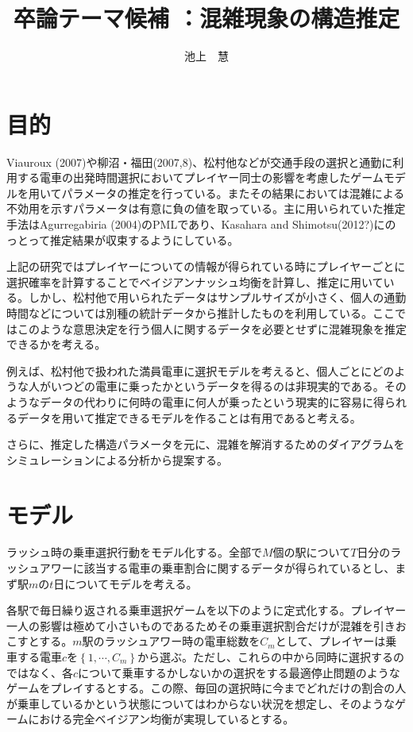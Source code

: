 \documentclass{jsarticle}
\begin{document}
\title{卒論テーマ候補 ：混雑現象の構造推定}
\author{池上　慧}
\maketitle

\section{目的}
Viauroux (2007)や柳沼・福田(2007,8)、松村他などが交通手段の選択と通勤に利用する電車の出発時間選択においてプレイヤー同士の影響を考慮したゲームモデルを用いてパラメータの推定を行っている。またその結果においては混雑による不効用を示すパラメータは有意に負の値を取っている。主に用いられていた推定手法はAgurregabiria (2004)のPMLであり、Kasahara and Shimotsu(2012?)にのっとって推定結果が収束するようにしている。

上記の研究ではプレイヤーについての情報が得られている時にプレイヤーごとに選択確率を計算することでベイジアンナッシュ均衡を計算し、推定に用いている。しかし、松村他で用いられたデータはサンプルサイズが小さく、個人の通勤時間などについては別種の統計データから推計したものを利用している。ここではこのような意思決定を行う個人に関するデータを必要とせずに混雑現象を推定できるかを考える。

例えば、松村他で扱われた満員電車に選択モデルを考えると、個人ごとにどのような人がいつどの電車に乗ったかというデータを得るのは非現実的である。そのようなデータの代わりに何時の電車に何人が乗ったという現実的に容易に得られるデータを用いて推定できるモデルを作ることは有用であると考える。

さらに、推定した構造パラメータを元に、混雑を解消するためのダイアグラムをシミュレーションによる分析から提案する。

\section{モデル}
ラッシュ時の乗車選択行動をモデル化する。全部で$M$個の駅について$T$日分のラッシュアワーに該当する電車の乗車割合に関するデータが得られているとし、まず駅$m$の$t$日についてモデルを考える。

各駅で毎日繰り返される乗車選択ゲームを以下のように定式化する。プレイヤー一人の影響は極めて小さいものであるためその乗車選択割合だけが混雑を引きおこすとする。$m$駅のラッシュアワー時の電車総数を$C_m$として、プレイヤーは乗車する電車$c$を$\left\{ 1, \cdots, C_m\right\}$から選ぶ。ただし、これらの中から同時に選択するのではなく、各$c$について乗車するかしないかの選択をする最適停止問題のようなゲームをプレイするとする。この際、毎回の選択時に今までどれだけの割合の人が乗車しているかという状態についてはわからない状況を想定し、そのようなゲームにおける完全ベイジアン均衡が実現しているとする。
\end{document}

